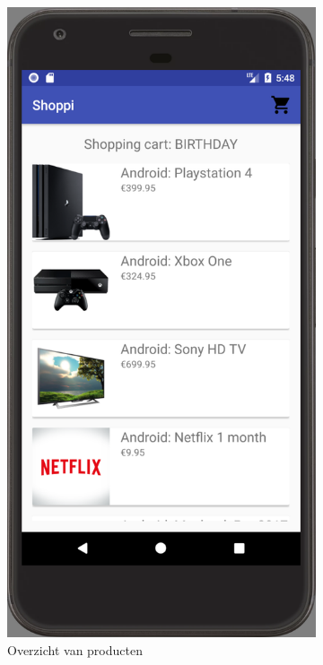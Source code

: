 \begin{figure}[H]
\begin{subfigure}{.5\textwidth}
		\includegraphics[width=0.65\linewidth]{img/poc/android/2.png}
		\caption{Overzicht van producten}
		\label{fig:sub2}
	\end{subfigure}
\begin{subfigure}{.5\textwidth}
	\centering

\end{subfigure}
\end{figure}
